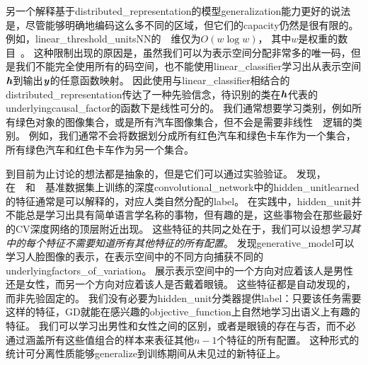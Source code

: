 
另一个解释基于\gls{distributed_representation}的模型\gls{generalization}能力更好的说法是，尽管能够明确地编码这么多不同的区域，但它们的\gls{capacity}仍然是很有限的。
例如，\gls{linear_threshold_units}\gls{NN}的~~维仅为$O(w\log w)$， 其中$w$是权重的数目~\citep{sontag1998vc}。
这种限制出现的原因是，虽然我们可以为表示空间分配非常多的唯一码，但是我们不能完全使用所有的码空间，也不能使用\gls{linear_classifier}学习出从表示空间$\boldsymbol{\mathit{h}}$到输出$\boldsymbol{\mathit{y}}$的任意函数映射。
因此使用与\gls{linear_classifier}相结合的\gls{distributed_representation}传达了一种先验信念，待识别的类在$\boldsymbol{\mathit{h}}$代表的\gls{underlying}\gls{causal_factor}的函数下是线性可分的。
我们通常想要学习类别，例如所有绿色对象的图像集合，或是所有汽车图像集合，但不会是需要非线性~~逻辑的类别。
例如，我们通常不会将数据划分成所有红色汽车和绿色卡车作为一个集合，所有绿色汽车和红色卡车作为另一个集合。


到目前为止讨论的想法都是抽象的，但是它们可以通过实验验证。
\cite{Zhou-et-al-ICLR2015}发现，在~~和~~基准数据集上训练的深度\gls{convolutional_network}中的\gls{hidden_unit}\gls{learned}的特征通常是可以解释的，对应人类自然分配的\gls{label}。
在实践中，\gls{hidden_unit}并不能总是学习出具有简单语言学名称的事物，但有趣的是，这些事物会在那些最好的\gls{CV}深度网络的顶层附近出现。
这些特征的共同之处在于，我们可以设想\emph{学习其中的每个特征不需要知道所有其他特征的所有配置}。
\cite{radford2015unsupervised}发现\gls{generative_model}可以学习人脸图像的表示，在表示空间中的不同方向捕获不同的\gls{underlying}\gls{factors_of_variation}。
展示表示空间中的一个方向对应着该人是男性还是女性，而另一个方向对应着该人是否戴着眼镜。
这些特征都是自动发现的，而非先验固定的。
我们没有必要为\gls{hidden_unit}分类器提供\gls{label}：只要该任务需要这样的特征，\gls{GD}就能在感兴趣的\gls{objective_function}上自然地学习出语义上有趣的特征。
我们可以学习出男性和女性之间的区别，或者是眼镜的存在与否，而不必通过涵盖所有这些值组合的样本来表征其他$n-1$个特征的所有配置。
这种形式的统计可分离性质能够\gls{generalize}到训练期间从未见过的新特征上。



